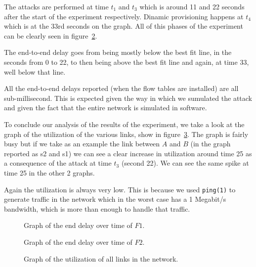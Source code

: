 \documentclass[twocolumn]{article}
\begin{document}
The attacks are performed at time $t_1$ and $t_3$ which is around 11 and 22
seconds after the start of the experiment respectively. Dinamic provisioning
happens at $t_4$ which is at the 33rd seconds on the graph. All of this phases
of the experiment can be clearly seen in figure~\ref{fig:f2}.

The end-to-end delay goes from being mostly below the best fit line, in the
seconds from 0 to 22, to then being above the best fit line and again, at time
33, well below that line.

All the end-to-end delays reported (when the flow tables are installed) are all
sub-millisecond. This is expected given the way in which we sumulated the attack
and given the fact that the entire network is simulated in software.

To conclude our analysis of the results of the experiment, we take a look at the
graph of the utilization of the various links, show in
figure~\ref{fig:utilization}. The graph is fairly busy but if we take as an
example the link between $A$ and $B$ (in the graph reported as \textsf{s2} and
\textsf{s1}) we can see a clear increase in utilization around time 25 as a
consequence of the attack at time $t_3$ (second 22). We can see the same spike
at time 25 in the other 2 graphs.

Again the utilization is always very low. This is because we used
\texttt{ping(1)} to generate traffic in the network which in the worst case has
a 1 Megabit/s bandwidth, which is more than enough to handle that traffic.

\newpage

\begin{figure}
\resizebox{\columnwidth}{!}{\texttt{[image: h1]}}
\caption{Graph of the end delay over time of $F1$.}
\label{fig:f1}
\end{figure}

\begin{figure}
\resizebox{\columnwidth}{!}{\texttt{[image: h2]}}
\caption{Graph of the end delay over time of $F2$.}
\label{fig:f2}
\end{figure}

\begin{figure}
\caption{Graph of the utilization of all links in the network.}
\label{fig:utilization}
\end{figure}

\clearpage



\end{document}

